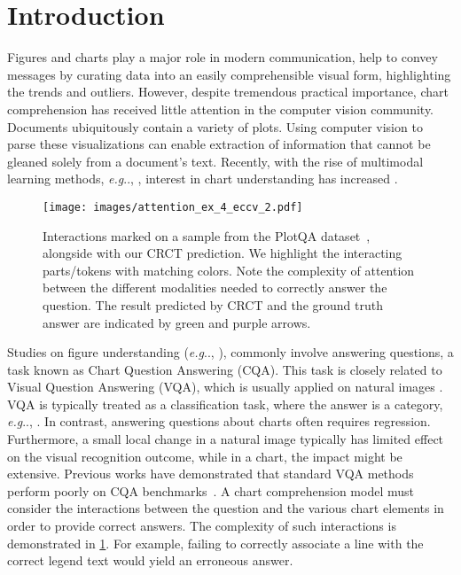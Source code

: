 \documentclass[runningheads]{llncs}
\makeatletter
\newcommand\our[1][]{CRCT\xspace}
\DeclareRobustCommand\onedot{\futurelet\@let@token\@onedot}
\def\@onedot{\ifx\@let@token.\else.\null\fi\xspace}
\def\eg{\emph{e.g}\onedot} \def\Eg{\emph{E.g}\onedot}
\makeatother
\begin{document}
\section{Introduction}
Figures and charts play a major role in modern communication, help to convey messages by curating data into an easily comprehensible visual form, highlighting the trends and outliers. 
However, despite tremendous practical importance, chart comprehension has received little attention in the computer vision community. Documents ubiquitously contain a variety of plots. Using computer vision to parse these visualizations can enable extraction of information that cannot be gleaned solely from a document’s text. Recently, with the rise of multimodal learning methods, \eg, \cite{yang2016stacked, vilbert, miech2019howto100m, clip, textvqa, changpinyo2021conceptual, visdial, schwartz2020factor}, interest in chart understanding has increased \cite{figureqa, plotqa, chartqa, chaudhry2019leafqa, dvqa, prefil}. 

\begin{figure}[ht]
	\begin{center}
		\texttt{[image: images/attention\_ex\_4\_eccv\_2.pdf]}
\end{center}
	\caption{Interactions marked on a sample from the PlotQA dataset~\cite{plotqa}, alongside with our \our prediction. We highlight the interacting parts/tokens with matching colors. Note the complexity of attention between the different modalities needed to correctly answer the question. The result predicted by \our and the ground truth answer are indicated by green and purple arrows.}
\label{fig:Examples_for_Introduction}
\end{figure}

Studies on figure understanding (\eg, \cite{figureqa,plotqa}), commonly involve answering questions, a task known as Chart Question Answering (CQA). This task is closely related to Visual Question Answering (VQA), which is usually applied on natural images \cite{VQA, yang2016stacked, visdial, textvqa}. VQA is typically treated as a classification task, where the answer is a category, \eg, \cite{VQA, malinowski2015multiworld, acharya2018tallyqa, yang2016stacked}. In contrast, answering questions about charts often requires regression. Furthermore, a small local change in a natural image typically has limited effect on the visual recognition outcome, while in a chart, the impact might be extensive. Previous works have demonstrated that standard VQA methods perform poorly on CQA benchmarks~\cite{plotqa, dvqa}. A chart comprehension model must consider the interactions between the question and the various chart elements in order to provide correct answers. The complexity of such interactions is demonstrated in \cref{fig:Examples_for_Introduction}.
For example, failing to correctly associate a line with the correct legend text would yield an erroneous answer. 
\end{document}

